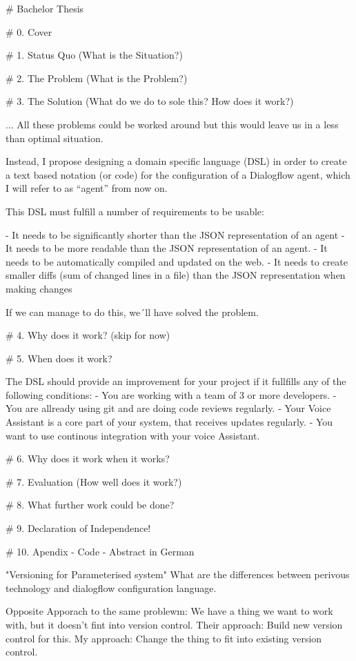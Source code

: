 # Bachelor Thesis

# 0. Cover

# 1. Status Quo (What is the Situation?)

# 2. The Problem (What is the Problem?)

# 3. The Solution (What do we do to sole this? How does it work?)

... All these problems could be worked around but this would leave us in a less than optimal situation.

Instead, I propose designing a domain specific language (DSL) in order to create a text based notation (or code) for the configuration of a Dialogflow agent, which I will refer to as “agent” from now on.

This DSL must fulfill a number of requirements to be usable:

- It needs to be significantly shorter than the JSON representation of an agent
- It needs to be more readable than the JSON representation of an agent.
- It needs to be automatically compiled and updated on the web.
- It needs to create smaller diffs (sum of changed lines in a file) than the JSON representation when making changes

If we can manage to do this, we´ll have solved the problem.

# 4. Why does it work? (skip for now)

# 5. When does it work?

The DSL should provide an improvement for your project if it fullfills any of the following conditions:
- You are working with a team of 3 or more developers.
- You are allready using git and are doing code reviews regularly.
- Your Voice Assistant is a core part of your system, that receives updates regularly. 
- You want to use continous integration with your voice Assistant.

# 6. Why does it work when it works?

# 7. Evaluation (How well does it work?)

# 8. What further work could be done?

# 9. Declaration of Independence!

# 10. Apendix
 - Code
 - Abstract in German


"Versioning for Parameterised system"
What are the differences between perivous technology and dialogflow configuration language.

Opposite Apporach to the same problewm:
We have a thing we want to work with, but it doesn't fint into version control. 
Their approach: Build new version control for this. 
My approach: Change the thing to fit into existing version control.

